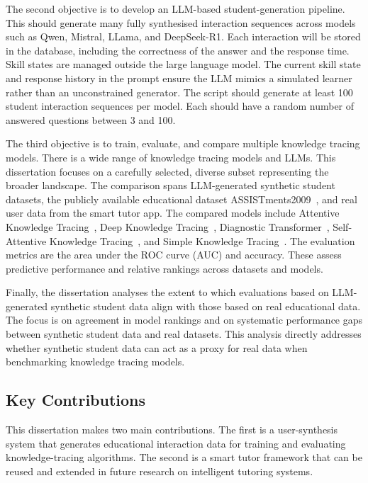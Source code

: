 The second objective is to develop an LLM-based student-generation pipeline. This should generate many fully synthesised interaction sequences across models such as Qwen, Mistral, LLama, and DeepSeek-R1. Each interaction will be stored in the database, including the correctness of the answer and the response time. Skill states are managed outside the large language model. The current skill state and response history in the prompt ensure the LLM mimics a simulated learner rather than an unconstrained generator. The script should generate at least 100 student interaction sequences per model. Each should have a random number of answered questions between 3 and 100.

The third objective is to train, evaluate, and compare multiple knowledge tracing models. There is a wide range of knowledge tracing models and LLMs. This dissertation focuses on a carefully selected, diverse subset representing the broader landscape. The comparison spans LLM-generated synthetic student datasets, the publicly available educational dataset ASSISTments2009~\autocite{assist2009}, and real user data from the smart tutor app. The compared models include Attentive Knowledge Tracing~\autocite{akt}, Deep Knowledge Tracing~\autocite{dkt}, Diagnostic Transformer~\autocite{dtransformer}, Self-Attentive Knowledge Tracing~\autocite{sakt}, and Simple Knowledge Tracing~\autocite{simpleKT}. The evaluation metrics are the area under the ROC curve (AUC) and accuracy. These assess predictive performance and relative rankings across datasets and models.

Finally, the dissertation analyses the extent to which evaluations based on LLM-generated synthetic student data align with those based on real educational data. The focus is on agreement in model rankings and on systematic performance gaps between synthetic student data and real datasets. This analysis directly addresses whether synthetic student data can act as a proxy for real data when benchmarking knowledge tracing models.

\subsection{Key Contributions}
This dissertation makes two main contributions. The first is a user-synthesis system that generates educational interaction data for training and evaluating knowledge-tracing algorithms. The second is a smart tutor framework that can be reused and extended in future research on intelligent tutoring systems.

